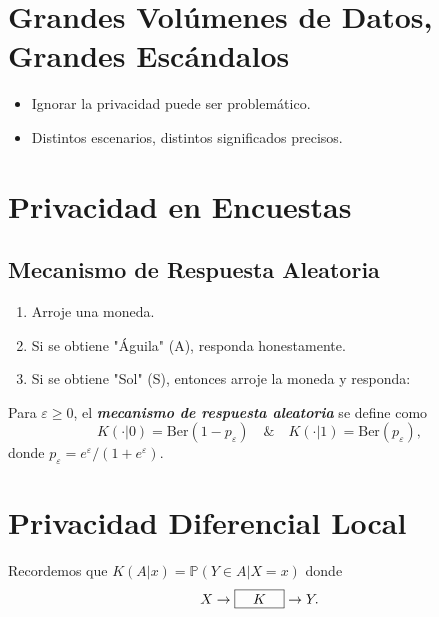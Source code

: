 \section{Grandes Vol\'umenes de Datos,\\ Grandes Esc\'andalos}

\begin{itemize}
    \item Ignorar la privacidad puede ser problem\'atico.
    \item Distintos escenarios, distintos significados precisos.  
\end{itemize}

\section{Privacidad en Encuestas}

\subsection{Mecanismo de Respuesta Aleatoria}
\begin{enumerate}
    \item Arroje una moneda.
    \item Si se obtiene "\'Aguila" (A), responda honestamente.
    \item Si se obtiene "Sol" (S), entonces arroje la moneda y responda:
    \begin{center}
    \end{center}
\end{enumerate}

\begin{definition}\cite{warner1965randomized}
Para $\varepsilon\geq0$, el \textit{\textbf{mecanismo de respuesta aleatoria}} se define como 
\begin{equation*}
    K(\cdot|0)=\text{Ber}(1-p_\varepsilon)\quad\&\quad K(\cdot|1)=\text{Ber}(p_\varepsilon),
\end{equation*}
donde $p_\varepsilon=e^\varepsilon/(1+e^{\varepsilon})$.
\end{definition}

\section{Privacidad Diferencial Local}

\begin{notation}\cite{evfimievski2003limiting}
Recordemos que $K(A|x)=\mathbb{P}(Y\in A|X=x)$ donde 
\begin{equation*}
    X\rightarrow\fbox{\quad$K$\quad}\rightarrow Y.
\end{equation*}
\end{notation}

